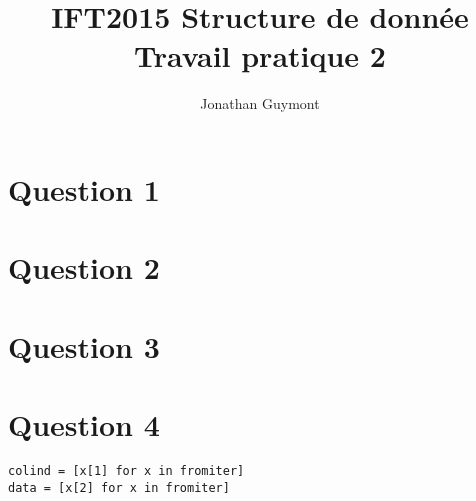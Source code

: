 \documentclass[10pt]{article}
\title{IFT2015 Structure de donnée\\Travail pratique 2}
\author{Jonathan Guymont}
\begin{document}
\maketitle

\section*{Question 1}

\section*{Question 2}

\section*{Question 3}

\section*{Question 4}


\begin{verbatim}
colind = [x[1] for x in fromiter]
data = [x[2] for x in fromiter]
\end{verbatim}
\end{document}

